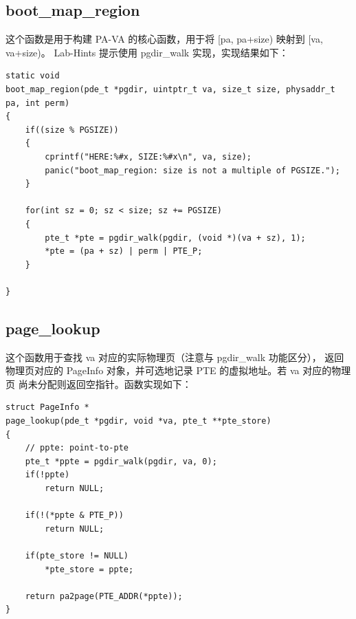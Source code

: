\documentclass[12pt, letterpaper]{report}
\begin{document}
\newpage
\subsection{\large boot\_map\_region}
这个函数是用于构建 PA-VA 的核心函数，用于将 [pa, pa+size) 映射到 [va, va+size)。
Lab-Hints 提示使用 pgdir\_walk 实现，实现结果如下：\par 
\lstset{style=CStyle}
\setmainfont{Consolas}
\begin{lstlisting}
static void
boot_map_region(pde_t *pgdir, uintptr_t va, size_t size, physaddr_t pa, int perm)
{
    if((size % PGSIZE))
    {
        cprintf("HERE:%#x, SIZE:%#x\n", va, size);
        panic("boot_map_region: size is not a multiple of PGSIZE.");
    }

    for(int sz = 0; sz < size; sz += PGSIZE)
    {
        pte_t *pte = pgdir_walk(pgdir, (void *)(va + sz), 1);
        *pte = (pa + sz) | perm | PTE_P;
    }

}
\end{lstlisting}
\setmainfont{Times New Roman}

\subsection{\large page\_lookup}
这个函数用于查找 va 对应的实际物理页（注意与 pgdir\_walk 功能区分），
返回物理页对应的 PageInfo 对象，并可选地记录 PTE 的虚拟地址。若 va 对应的物理页
尚未分配则返回空指针。函数实现如下：\par 
\lstset{style=CStyle}
\setmainfont{Consolas}
\begin{lstlisting}
struct PageInfo *
page_lookup(pde_t *pgdir, void *va, pte_t **pte_store)
{
    // ppte: point-to-pte
    pte_t *ppte = pgdir_walk(pgdir, va, 0);
    if(!ppte)
        return NULL;

    if(!(*ppte & PTE_P))
        return NULL;

    if(pte_store != NULL)
        *pte_store = ppte;

    return pa2page(PTE_ADDR(*ppte));
}
\end{lstlisting}
\setmainfont{Times New Roman}

\newpage
\end{document}
